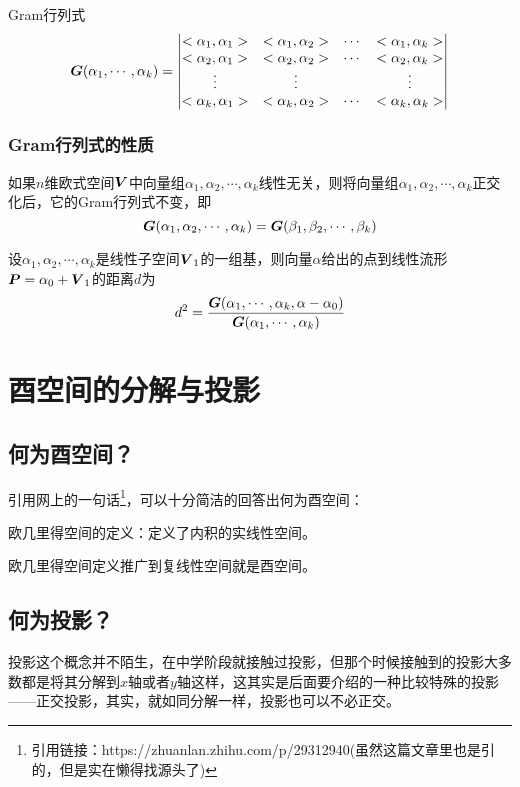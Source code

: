 \documentclass[12pt, a4paper, oneside, UTF8]{ctexbook}
\begin{document}
\begin{defn}{Gram行列式}{}
    \[\boldsymbol{G}(\alpha_1,\cdots,\alpha_k)=\begin{vmatrix}
        <\alpha_1,\alpha_1>&<\alpha_1,\alpha_2>&\cdots&<\alpha_1,\alpha_k>\\
        <\alpha_2,\alpha_1>&<\alpha_2,\alpha_2>&\cdots&<\alpha_2,\alpha_k>\\
        \vdots&\vdots&&\vdots\\
        <\alpha_k,\alpha_1>&<\alpha_k,\alpha_2>&\cdots&<\alpha_k,\alpha_k>\\
    \end{vmatrix}\]
\end{defn}
\subsubsection{Gram行列式的性质}
如果$n$维欧式空间$\boldsymbol{V}$中向量组$\alpha_1,\alpha_2,\cdots,\alpha_k$线性无关，则将向量组$\alpha_1,\alpha_2,\cdots,\alpha_k$正交化后，它的Gram行列式不变，即\[\boldsymbol{G}(\alpha_1,\alpha_2,\cdots,\alpha_k)=\boldsymbol{G}(\beta_1,\beta_2,\cdots,\beta_k)\]

\begin{them}{}{}
    设$\alpha_1,\alpha_2,\cdots,\alpha_k$是线性子空间$\boldsymbol{V}_1$的一组基，则向量$\alpha$给出的点到线性流形$\boldsymbol{P}=\alpha_0+\boldsymbol{V}_1$的距离$d$为\[d^2=\frac{\boldsymbol{G}(\alpha_1,\cdots,\alpha_k,\alpha-\alpha_0)}{\boldsymbol{G}(\alpha_1,\cdots,\alpha_k)}\]
\end{them}
\section{酉空间的分解与投影}
\subsection{何为酉空间？}
引用网上的一句话\footnote[1]{引用链接：https://zhuanlan.zhihu.com/p/29312940(虽然这篇文章里也是引的，但是实在懒得找源头了)}，可以十分简洁的回答出何为酉空间：

欧几里得空间的定义：定义了内积的实线性空间。

欧几里得空间定义推广到复线性空间就是酉空间。

\subsection{何为投影？}
投影这个概念并不陌生，在中学阶段就接触过投影，但那个时候接触到的投影大多数都是将其分解到$x$轴或者$y$轴这样，这其实是后面要介绍的一种比较特殊的投影——正交投影，其实，就如同分解一样，投影也可以不必正交。
\end{document}
